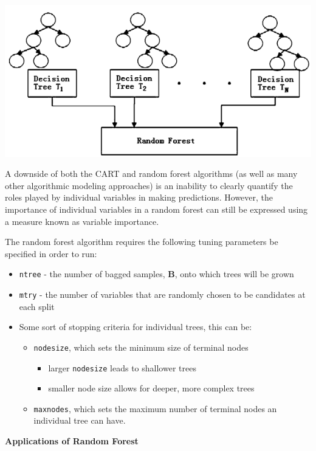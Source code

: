 \documentclass[
  a4paper,
  twoside,
  openright]{book}
\providecommand{\tightlist}{%
  \setlength{\itemsep}{0pt}\setlength{\parskip}{0pt}}
\theoremstyle{definition}
\theoremstyle{definition}
\theoremstyle{definition}
\theoremstyle{definition}
\theoremstyle{remark}
\begin{document}
\includegraphics[width=0.8\linewidth]{images/rf}

A downside of both the CART and random forest algorithms (as well as many other algorithmic modeling approaches) is an inability to clearly quantify the roles played by individual variables in making predictions. However, the importance of individual variables in a random forest can still be expressed using a measure known as variable importance.

The random forest algorithm requires the following tuning parameters be specified in order to run:

\begin{itemize}
\tightlist
\item
  \texttt{ntree} - the number of bagged samples, \(\boldsymbol{B}\), onto which trees will be grown
\item
  \texttt{mtry} - the number of variables that are randomly chosen to be candidates at each split
\item
  Some sort of stopping criteria for individual trees, this can be:

  \begin{itemize}
  \tightlist
  \item
    \texttt{nodesize}, which sets the minimum size of terminal nodes

    \begin{itemize}
    \tightlist
    \item
      larger \texttt{nodesize} leads to shallower trees
    \item
      smaller node size allows for deeper, more complex trees
    \end{itemize}
  \item
    \texttt{maxnodes}, which sets the maximum number of terminal nodes an individual tree can have.
  \end{itemize}
\end{itemize}

\textbf{Applications of Random Forest}
\end{document}
